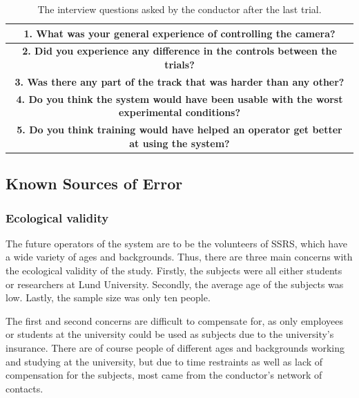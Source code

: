 \documentclass[nofilelist]{cslthse-msc}
\begin{document}
\setlength{\extrarowheight}{5pt}
\vspace{10pt}

\begin{table}[!hbt]
   \centering
      \begin{tabular}{|c|}
         \hline
         \textbf{1. What was your general experience of controlling the camera?} \\
         \hline
         \textbf{2. Did you experience any difference in the controls between the trials?} \\
         \hline
         \textbf{3. Was there any part of the track that was harder than any other?} \\
         \hline
         \textbf{4. Do you think the system would have been usable with the worst experimental conditions?} \\
         \hline
         \textbf{5. Do you think training would have helped an operator get better at using the system?} \\
         \hline
      \end{tabular}
   \caption{The interview questions asked by the conductor after the last trial.}
   \label{tab:interview-questions}
\end{table}

\vspace{10pt}

\subsection{Known Sources of Error}
\label{sources-of-error}

\subsubsection{Ecological validity}
The future operators of the system are to be the volunteers of SSRS, which have a wide variety of ages and backgrounds. Thus, there are three main concerns with the ecological validity of the study. Firstly, the subjects were all either students or researchers at Lund University. Secondly, the average age of the subjects was low. Lastly, the sample size was only ten people. 

The first and second concerns are difficult to compensate for, as only employees or students at the university could be used as subjects due to the university's insurance. There are of course people of different ages and backgrounds working and studying at the university, but due to time restraints as well as lack of compensation for the subjects, most came from the conductor's network of contacts.
\end{document}
